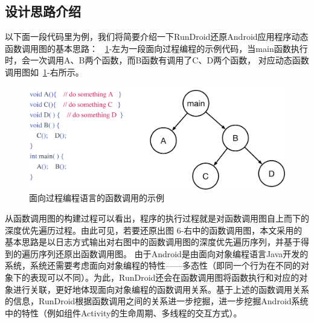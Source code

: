 
\subsection{ 设计思路介绍}
以下面一段代码里为例，我们将简要介绍一下RunDroid还原Android应用程序动态函数调用图的基本思路：
~\ref{fig:code_sample}-左为一段面向过程编程的示例代码，当main函数执行时，会一次调用A、B两个函数，而B函数有调用了C、D两个函数，
对应动态函数调用图如~\ref{fig:code_sample}-右所示。
 
 
 \begin{figure}
	\centering
	\includegraphics[width=\textwidth]{./Figures/code-sample.png}
	\caption{ 面向过程编程语言的函数调用的示例}
	\label{fig:code_sample}
\end{figure}


从函数调用图的构建过程可以看出，程序的执行过程就是对函数调用图自上而下的深度优先遍历过程。由此可见，若要还原出图 6-右中的函数调用图，本文采用的基本思路是以日志方式输出对右图中的函数调用图的深度优先遍历序列，并基于得到的遍历序列还原出函数调用图。
由于Android是由面向对象编程语言Java开发的系统，系统还需要考虑面向对象编程的特性——多态性（即同一个行为在不同的对象下的表现可以不同）。为此，RunDroid还会在函数调用图将函数执行和对应的对象进行关联，更好地体现面向对象编程的函数调用关系。基于上述的函数调用关系的信息，RunDroid根据函数调用之间的关系进一步挖掘，进一步挖掘Android系统中的特性（例如组件Activity的生命周期、多线程的交互方式）。

